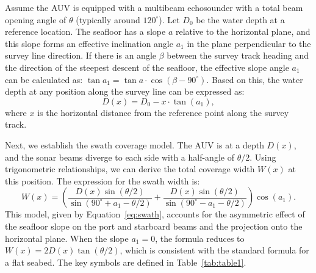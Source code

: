 \documentclass[compress]{cm}
\begin{document}
Assume the AUV is equipped with a multibeam echosounder with a total beam opening angle of $\theta$ (typically around $120^{\circ}$). Let $D_0$ be the water depth at a reference location. The seafloor has a slope $a$ relative to the horizontal plane, and this slope forms an effective inclination angle $a_1$ in the plane perpendicular to the survey line direction. If there is an angle $\beta$ between the survey track heading and the direction of the steepest descent of the seafloor, the effective slope angle $a_1$ can be calculated as: $\tan a_1 = \tan a \cdot \cos(\beta - 90^{\circ})$. Based on this, the water depth at any position along the survey line can be expressed as:
\begin{equation}
D(x) = D_0 - x \cdot \tan(a_1),
\label{eq:depth}
\end{equation}
where $x$ is the horizontal distance from the reference point along the survey track.

Next, we establish the swath coverage model. The AUV is at a depth $D(x)$, and the sonar beams diverge to each side with a half-angle of $\theta/2$. Using trigonometric relationships, we can derive the total coverage width $W(x)$ at this position. The expression for the swath width is:
\begin{equation}
W(x) = \left( \frac{D(x) \sin(\theta/2)}{\sin(90^{\circ} + a_1 - \theta/2)} + \frac{D(x) \sin(\theta/2)}{\sin(90^{\circ} - a_1 - \theta/2)} \right) \cos(a_1).
\label{eq:swath}
\end{equation}
This model, given by Equation~\eqref{eq:swath}, accounts for the asymmetric effect of the seafloor slope on the port and starboard beams and the projection onto the horizontal plane. When the slope $a_1 = 0$, the formula reduces to $W(x) = 2D(x)\tan(\theta/2)$, which is consistent with the standard formula for a flat seabed. The key symbols are defined in Table~\ref{tab:table1}.
\end{document}
